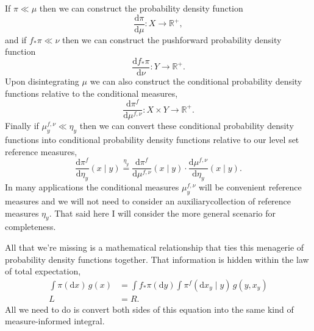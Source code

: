 \documentclass[
  letterpaper,
  DIV=11,
  numbers=noendperiod]{scrartcl}
\begin{document}
If \(\pi \ll \mu\) then we can construct the probability density
function \[
\frac{ \mathrm{d}  \pi }{ \mathrm{d}  \mu  } : X \rightarrow \mathbb{R}^{+},
\] and if \(f_{*} \pi \ll \nu\) then we can construct the pushforward
probability density function \[
\frac{ \mathrm{d}  f_{*} \pi }{ \mathrm{d}  \nu  } : Y \rightarrow \mathbb{R}^{+}.
\] Upon disintegrating \(\mu\) we can also construct the conditional
probability density functions relative to the conditional measures, \[
\frac{ \mathrm{d}  \pi^{f} }{ \mathrm{d}  \mu^{f, \nu}  }
: X \times Y \rightarrow \mathbb{R}^{+}.
\] Finally if \(\mu^{f, \nu}_{y} \ll \eta_{y}\) then we can convert
these conditional probability density functions into conditional
probability density functions relative to our level set reference
measures, \[
\frac{ \mathrm{d}  \pi^{f} }{ \mathrm{d}  \eta_{y}  } (x \mid y)
\overset{ \eta_{y} }{=}
\frac{ \mathrm{d}  \pi^{f} }{ \mathrm{d}  \mu^{f, \nu}  } (x \mid y)
\cdot
\frac{ \mathrm{d}  \mu^{f, \nu} }{ \mathrm{d}  \eta_{y}  } (x \mid y).
\] In many applications the conditional measures \(\mu^{f, \nu}_{y}\)
will be convenient reference measures and we will not need to consider
an auxiliarycollection of reference measures \(\eta_{y}\). That said
here I will consider the more general scenario for completeness.

All that we're missing is a mathematical relationship that ties this
menagerie of probability density functions together. That information is
hidden within the law of total expectation, \begin{align*}
\int \pi( \mathrm{d} x ) \, g(x)
&=
\int f_{*} \pi (\mathrm{d} y)
\int \pi^{f}( \mathrm{d}x_y \mid y ) \, g(y, x_{y})
\\
L
&=
R.
\end{align*} All we need to do is convert both sides of this equation
into the same kind of measure-informed integral.
\end{document}
